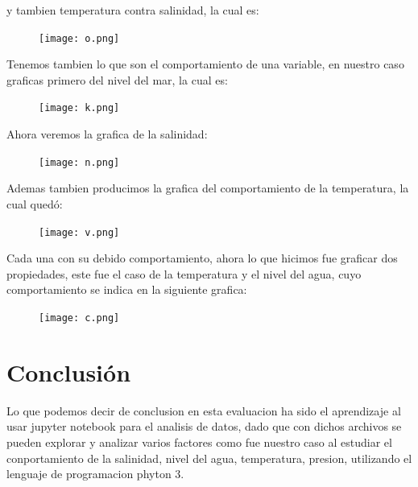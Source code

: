 \documentclass{article}
\begin{document}
\newpage
y tambien temperatura contra salinidad, la cual es:
\begin{figure}[h]
\centering
\texttt{[image: o.png]}
\end{figure}

Tenemos tambien lo que son el comportamiento de una variable, en nuestro caso graficas primero del nivel del mar, la cual es:

\begin{figure}[h]
\centering
\texttt{[image: k.png]}
\end{figure}

\newpage
Ahora veremos la grafica de la salinidad:

\begin{figure}[h]
\centering
\texttt{[image: n.png]}
\end{figure}

Ademas tambien producimos la grafica del comportamiento de la temperatura, la cual quedó:

\begin{figure}[h]
\centering
\texttt{[image: v.png]}
\end{figure}

\newpage
Cada una con su debido comportamiento, ahora lo que hicimos fue graficar dos propiedades, este fue el caso de la temperatura y el nivel del agua, cuyo comportamiento se indica en la siguiente grafica:

\begin{figure}[h]
\centering
\texttt{[image: c.png]}
\end{figure}

\section{Conclusión}
Lo que podemos decir de conclusion en esta evaluacion ha sido el aprendizaje al usar jupyter notebook para el analisis de datos, dado que con dichos archivos se pueden explorar y analizar varios factores como fue nuestro caso al estudiar el conportamiento de la salinidad, nivel del agua, temperatura, presion, utilizando el lenguaje de programacion phyton 3.
\end{document}
